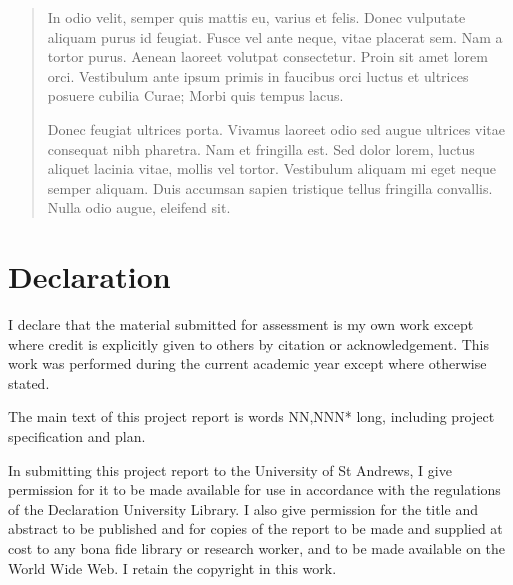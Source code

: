
\begin{abstract}
	In odio velit, semper quis mattis eu, varius et felis. Donec vulputate aliquam purus id feugiat. Fusce vel ante neque, vitae placerat sem. Nam a tortor purus. Aenean laoreet volutpat consectetur. Proin sit amet lorem orci. Vestibulum ante ipsum primis in faucibus orci luctus et ultrices posuere cubilia Curae; Morbi quis tempus lacus.


	Donec feugiat ultrices porta. Vivamus laoreet odio sed augue ultrices vitae consequat nibh pharetra. Nam et fringilla est. Sed dolor lorem, luctus aliquet lacinia vitae, mollis vel tortor. Vestibulum aliquam mi eget neque semper aliquam. Duis accumsan sapien tristique tellus fringilla convallis. Nulla odio augue, eleifend sit.
\end{abstract}

\sectionfont{
	\sectionrule{0pt}{0pt}{-10pt}{0.8pt}
}

\section*{Declaration}
I declare that the material submitted for assessment is my own work except where credit is explicitly given to others by citation or acknowledgement. This work was performed during the current academic year except where otherwise stated.

The main text of this project report is words NN,NNN* long, including project specification and plan. 

In submitting this project report to the University of St Andrews, I give permission for it to be made available for use in accordance with the regulations of the Declaration University Library. I also give permission for the title and abstract to be published and for copies of the report to be made and supplied at cost to any bona fide library or research worker, and to be made available on the World Wide Web. I retain the copyright in this work.
